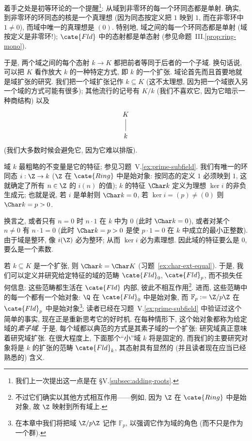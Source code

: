 着手之处是初等环论的一个提醒\footnote{我们上一次提出这一点是在 §V.\ref{subsec:adding-roots}.}: 从域到非零环的每一个环同态都是单射. 确实, 到非零环的环同态的核是一个真理想 (因为同态按定义把 $1$ 映到 $1$, 而在非零环中 $1\neq 0$), 而域中唯一的真理想是 $(0)$. 特别地, 域之间的每一个环同态都是单射 (域按定义是非零环!); $\cate{Fld}$ 中的态射都是单态射 (参见命题~III.\ref{prop:ring-mono}).

于是, 两个域之间的每个态射 $k\to K$ 都把前者等同于后者的一个子域. 换句话说, 可以把 $K$ 看作放大 $k$ 的一种特定方式, 即 $k$ 的一个扩张. 域论首先而且首要地就是域扩张的研究. 我们把一个域扩张记作 $k\subseteq K$ (这不太理想, 因为把一个域嵌入另一个域的方式可能有很多); 其他流行的记号有 $K/k$ (我们不喜欢它, 因为它暗示一种商结构) 以及
\[
\begin{tikzcd}
K \ar[d,no head] \\
k
\end{tikzcd}
\]
(我们大多数时候会避免它, 因为它难以排版).

域 $k$ 最粗略的不变量是它的特征; 参见习题~V.\ref{ex:prime-subfield}. 我们有唯一的环同态 $i:\Z\to k$ ($\Z$ 在 $\cate{Ring}$ 中是始对象: 按同态的定义 $1$ 必须映到 $1$, 这就确定了所有 $n\in\Z$ 的 $i(n)$ 的值); $k$ 的特征 $\Char k$ 定义为理想 $\ker i$ 的非负生成元; 也就是说, 若 $i$ 是单射则 $\Char k=0$, 若 $\ker i=(p)\neq(0)$ 则 $\Char k=p>0$.

换言之, 或者只有 $n=0$ 时 $n\cdot 1$ 在 $k$ 中为 $0$ (此时 $\Char k=0$), 或者对某个 $n\neq 0$ 有 $n\cdot 1=0$ (此时 $\Char k=p>0$ 是使 $p\cdot 1=0$ 在 $k$ 中成立的最小正整数). 由于域是整环, 像 $i(\Z)$ 必为整环; 从而 $\ker i$ 必为素理想. 因此域的特征要么是 $0$, 要么是一个素数.

若 $k\subseteq K$ 是一个扩张, 则 $\Char k=\Char K$ (习题~\ref{ex:char-ext-equal}). 于是, 我们可以定义并研究给定特征的域的范畴 $\cate{Fld}_0$, $\cate{Fld}_p$, 而不损失任何信息: 这些范畴都生活在 $\cate{Fld}$ 内部, 彼此不相互作用\footnote{不过它们确实以其他方式相互作用——例如, 因为 $\Z$ 在 $\cate{Ring}$ 中是始对象, 故 $\Z$ 映射到所有域上.}. 进而, 这些范畴中的每一个都有一个始对象: $\Q$ 在 $\cate{Fld}_0$ 中是始对象, 而 $\mathbb{F}_p:=\Z/p\Z$ 在 $\cate{Fld}_p$ 中是始对象\footnote{在本章中我们将把域 $\Z/p\Z$ 记作 $\mathbb{F}_p$, 以强调它作为域的角色 (而不只是作为一个群).}; 读者已经在习题~V.\ref{ex:prime-subfield} 中验证过这个简单的事实, 现在正是重新思考它的好时机. 在每种情形下, 这个始对象都称为给定域的\emph{素子域}. 于是, 每个域都以典范的方式是其素子域的一个扩张: 研究域真正意味着研究域扩张. 在很大程度上, 下面那个``小''域 $k$ 将是固定的, 而我们的主要研究对象将是 $k$ 的扩张的范畴 $\cate{Fld}_k$, 其态射具有显然的 (并且读者现在应当已经熟悉的) 含义.


